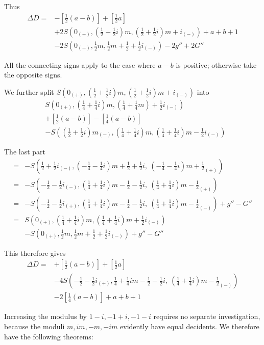 Thus
\[
\begin{aligned}
\Delta D={}&-\left[\tfrac12(a-b)\right]+\left[\tfrac12a\right]\\
&+2S(0_{(+)},(\tfrac12+\tfrac12i)m,(\tfrac12+\tfrac12i)m+i_{(-)})+a+b+1\\
&-2S(0_{(+)},\tfrac12m,\tfrac12m+\tfrac12+\tfrac12i_{(-)})-2g''+2G''
\end{aligned}
\]

All the connecting signs apply to the case where $a-b$ is positive; otherwise take the opposite signs.

We further split $S(0_{(+)},(\frac12+\frac12i)m,(\frac12+\frac12i)m+i_{(-)})$ into
\[
\begin{aligned}
&S(0_{(+)},(\tfrac14+\tfrac14i)m,(\tfrac14+\tfrac14m)+\tfrac12i_{(-)})\\
&+\left[\tfrac12(a-b)\right]-\left[\tfrac14(a-b)\right]\\
&-S((\tfrac12+\tfrac12i)m_{(-)},(\tfrac14+\tfrac14i)m,(\tfrac14+\tfrac14i)m-\tfrac12i_{(-)})
\end{aligned}
\]


The last part
\[
\begin{aligned}
={}&-S(\tfrac12+\tfrac12i_{(-)},(-\tfrac14-\tfrac14i)m+\tfrac12+\tfrac12i,\ (-\tfrac14-\tfrac14i)m+\tfrac12_{(+)})\\
={}&-S(-\tfrac12-\tfrac12i_{(-)},(\tfrac14+\tfrac14i)m-\tfrac12-\tfrac12i,\ (\tfrac14+\tfrac14i)m-\tfrac12_{(+)})\\
={}&-S(-\tfrac12-\tfrac12i_{(+)},(\tfrac14+\tfrac14i)m-\tfrac12-\tfrac12i,\ (\tfrac14+\tfrac14i)m-\tfrac12_{(-)})+g''-G''\\
={}&S(0_{(+)},(\tfrac14+\tfrac14i)m,(\tfrac14+\tfrac14i)m+\tfrac12i_{(-)})\\
&-S(0_{(+)},\tfrac12m,\tfrac12m+\tfrac12+\tfrac12i_{(-)})+g''-G''
\end{aligned}
\]

This therefore gives
\[
\begin{aligned}
\Delta D={}&+\left[\tfrac12(a-b)\right]+\left[\tfrac12a\right]\\
&-4S(-\tfrac12-\tfrac12i_{(+)},\tfrac14+\tfrac14im-\tfrac12-\tfrac12i,\ (\tfrac14+\tfrac14i)m-\tfrac12_{(-)})\\
&-2\left[\tfrac14(a-b)\right]+a+b+1
\end{aligned}
\]

Increasing the modulus by $1-i,-1+i,-1-i$ requires no separate investigation, because the moduli $m,im,-m,-im$ evidently have equal decidents. We therefore have the following theorems:


